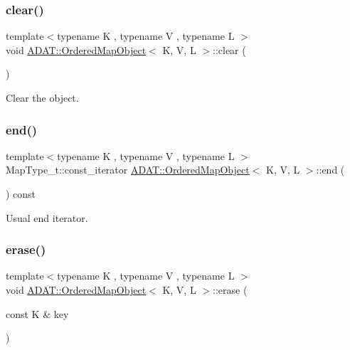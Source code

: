 \subsubsection{\texorpdfstring{clear()}{clear()}}
{\footnotesize\ttfamily template$<$typename K , typename V , typename L $>$ \\
void \mbox{\hyperlink{classADAT_1_1OrderedMapObject}{A\+D\+A\+T\+::\+Ordered\+Map\+Object}}$<$ K, V, L $>$\+::clear (\begin{DoxyParamCaption}{ }\end{DoxyParamCaption})\hspace{0.3cm}{\ttfamily [inline]}}



Clear the object. 

\mbox{\label{classADAT_1_1OrderedMapObject_ae6ad157b81bdf303beaee4422f313ed4}} 
\subsubsection{\texorpdfstring{end()}{end()}}
{\footnotesize\ttfamily template$<$typename K , typename V , typename L $>$ \\
Map\+Type\+\_\+t\+::const\+\_\+iterator \mbox{\hyperlink{classADAT_1_1OrderedMapObject}{A\+D\+A\+T\+::\+Ordered\+Map\+Object}}$<$ K, V, L $>$\+::end (\begin{DoxyParamCaption}{ }\end{DoxyParamCaption}) const\hspace{0.3cm}{\ttfamily [inline]}}



Usual end iterator. 

\mbox{\label{classADAT_1_1OrderedMapObject_af5d9aad7f7a1ce462dfed9cbe13c638c}} 
\subsubsection{\texorpdfstring{erase()}{erase()}}
{\footnotesize\ttfamily template$<$typename K , typename V , typename L $>$ \\
void \mbox{\hyperlink{classADAT_1_1OrderedMapObject}{A\+D\+A\+T\+::\+Ordered\+Map\+Object}}$<$ K, V, L $>$\+::erase (\begin{DoxyParamCaption}\item[{const K \&}]{key }\end{DoxyParamCaption})\hspace{0.3cm}{\ttfamily [inline]}}



